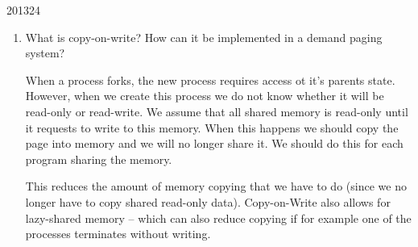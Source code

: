 \documentclass[10pt,\jkfside,a4paper]{article}
\begin{document}
\begin{examquestion}{2013}{2}{4}
\begin{enumerate}
\item What is copy-on-write? How can it be implemented in a demand paging system?

When a process forks, the new process requires access ot it's parents state. 
However, when we create this process we do not know whether it will be read-only 
or read-write. We assume that all shared memory is 
read-only until it requests to write to this memory. When this happens we should 
copy the page into memory and we will no longer share it. We should do this for 
each program sharing the memory.

This reduces the amount of memory copying that we have to do (since we no longer 
have to copy shared read-only data). Copy-on-Write also allows for lazy-shared memory -- which 
can also reduce copying if for example one of the processes terminates without writing.

\end{enumerate}

\end{examquestion}
\end{document}
